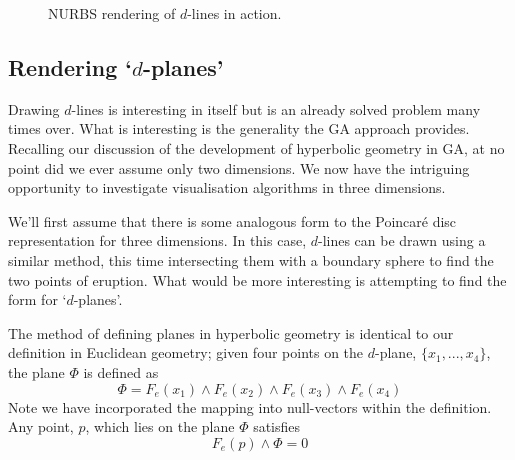 \begin{figure} \centering
{}
\caption{NURBS rendering of $d$-lines in action.}
\label{fig:hyp1}
\end{figure}

\subsection{Rendering `$d$-planes'}


Drawing $d$-lines is interesting in itself but is an already solved 
problem many times over. What is interesting is the generality the GA
approach provides. Recalling our discussion of the development of
hyperbolic geometry in GA, at no point did we ever assume only 
two dimensions. We now have the intriguing opportunity to investigate
visualisation algorithms in three dimensions.

We'll first assume that there is some analogous form to the Poincar\'e
disc representation for three dimensions. In this case, $d$-lines can
be drawn using a similar method, this time intersecting them with a 
boundary sphere to find the two points of eruption. What would be 
more interesting is attempting to find the form for `$d$-planes'.

The method of defining planes in hyperbolic geometry is identical
to our definition in Euclidean geometry; given four points on the
$d$-plane, $\{ x_1, ..., x_4 \}$, the plane $\Phi$ is defined as
\begin{equation}
\Phi = F_e(x_1) \wedge F_e(x_2) \wedge F_e(x_3) \wedge   F_e(x_4) 
\label{eqn:plane}
\end{equation}
Note we have incorporated the mapping into null-vectors within
the definition. Any point, $p$, which lies on the plane $\Phi$ satisfies
\[
F_e(p) \wedge \Phi = 0
\]

